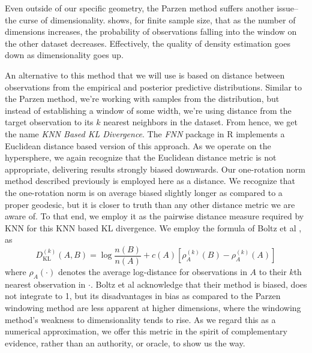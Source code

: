 Even outside of our specific geometry, the Parzen method suffers another issue--the curse of
  dimensionality.  \cite{boltz2009} shows, for finite sample size, that as the number of dimensions
  increases, the probability of observations falling into the window on the other dataset decreases.
  Effectively, the quality of density estimation goes down as dimensionality goes up.

An alternative to this method that we will use is based on distance between observations from the
  empirical and posterior predictive distributions.  Similar to the Parzen method, we're working
  with samples from the distribution, but instead of establishing a window of some width, we're
  using distance from the target observation to its $k$ nearest neighbors in the dataset.
  From hence, we get the name \emph{KNN Based KL Divergence}.  The \emph{FNN} package in R implements
  a Euclidean distance based version of this approach.  As we operate on the hypersphere, we again
  recognize that the Euclidean distance metric is not appropriate, delivering results strongly
  biased downwards.  Our one-rotation norm method described previously is employed here as a
  distance.  We recognize that the one-rotation norm is on average biased slightly longer as
  compared to a proper geodesic, but it is closer to truth than any other distance metric we are
  aware of.  To that end, we employ it as the pairwise distance measure required by KNN for this KNN
  based KL divergence.  We employ the formula of Boltz et al \cite{boltz2009}, as
  \begin{equation}
    \label{eqn:knnkld}
    D_{\text{KL}}^{(k)}(A,B) = \log\frac{n(B)}{n(A)} + c(A) \left[\rho_A^{(k)}(B) - \rho_A^{(k)}(A)\right]
  \end{equation}
  where $\rho_A(\cdot)$ denotes the average log-distance for observations in $A$ to their $k$th
  nearest observation in $\cdot$.  Boltz et al acknowledge that their method is biased, does not
  integrate to 1, but its disadvantages in bias as compared to the Parzen windowing method are less
  apparent at higher dimensions, where the windowing method's weakness to dimensionality tends to
  rise.  As we regard this as a numerical approximation, we offer this metric in the spirit of
  complementary evidence, rather than an authority, or oracle, to show us the way.
































